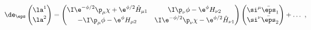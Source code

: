 \begin{equation}
  \de_\eps \begin{pmatrix} \la^1 \\[2pt] \la^2 \end{pmatrix} =
  \begin{pmatrix} \I \e^{-\phi/2} \p_\mu \chi + \e^{\phi/2}
  \hat{H}_{\mu1} & \I \p_\nu \phi - \e^\phi H_{\nu2} \\[2pt] -\I
  \p_\mu \phi - \e^\phi H_{\mu2} & \I	\e^{-\phi/2} \p_\nu \chi -
  \e^{\phi/2} \hat{H}_{\nu1} \end{pmatrix} \begin{pmatrix} \si^\mu
  \bar{\eps}_1 \\[2pt] \si^\nu \bar{\eps}_2 \end{pmatrix} + \dots \ ,
 \end{equation}

